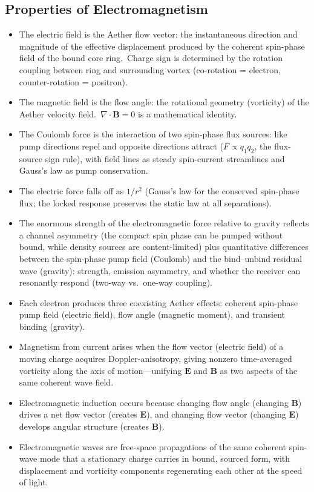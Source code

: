 ﻿\documentclass[12pt,letterpaper]{article}
\begin{document}
\subsection{Properties of Electromagnetism}

\begin{itemize}[leftmargin=2em]
  \item The electric field is the Aether flow vector: the instantaneous direction and
    magnitude of the effective displacement produced by the coherent spin-phase field
    of the bound core ring.\ Charge sign is determined by the rotation coupling between
    ring and surrounding vortex (co-rotation = electron, counter-rotation = positron).
  \item The magnetic field is the flow angle: the rotational geometry (vorticity) of the
    Aether velocity field.\ $\nabla \cdot \mathbf{B} = 0$ is a mathematical identity.
  \item The Coulomb force is the interaction of two spin-phase flux sources: like
    pump directions repel and opposite directions attract ($F \propto q_1 q_2$, the
    flux-source sign rule), with field lines as steady spin-current streamlines and
    Gauss's law as pump conservation.
  \item The electric force falls off as $1/r^2$ (Gauss's law for the conserved
    spin-phase flux; the locked response preserves the static law at all
    separations).
  \item The enormous strength of the electromagnetic force relative to gravity reflects
    a channel asymmetry (the compact spin phase can be pumped without bound, while
    density sources are content-limited) plus quantitative differences between the
    spin-phase pump field (Coulomb) and the bind--unbind residual wave (gravity):
    strength, emission asymmetry, and
    whether the receiver can resonantly respond (two-way vs.\ one-way coupling).
  \item Each electron produces three coexisting Aether effects: coherent spin-phase
    pump field (electric field), flow angle (magnetic moment), and transient binding
    (gravity).
  \item Magnetism from current arises when the flow vector (electric field) of a moving
    charge acquires Doppler-anisotropy, giving nonzero time-averaged vorticity along the
    axis of motion---unifying $\mathbf{E}$ and $\mathbf{B}$ as two aspects of the same
    coherent wave field.
  \item Electromagnetic induction occurs because changing flow angle (changing $\mathbf{B}$)
    drives a net flow vector (creates $\mathbf{E}$), and changing flow vector (changing
    $\mathbf{E}$) develops angular structure (creates $\mathbf{B}$).
  \item Electromagnetic waves are free-space propagations of the same coherent
    spin-wave mode that a stationary charge carries in bound, sourced
    form, with displacement and vorticity components regenerating each other at the
    speed of light.
\end{itemize}
\end{document}
